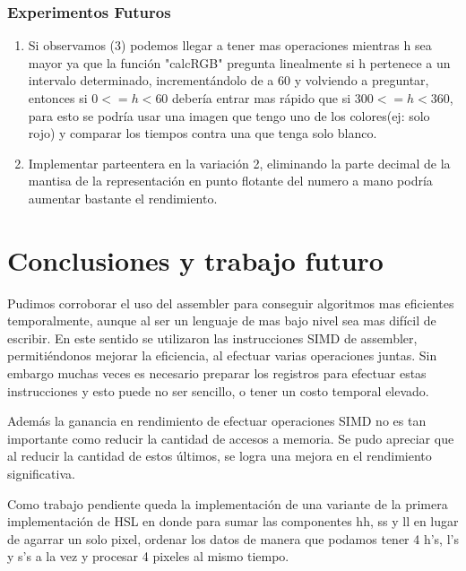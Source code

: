 \documentclass[a4paper]{article}
\begin{document}
\subsubsection{Experimentos Futuros}
\begin{enumerate}
  \item
    Si observamos (3) podemos llegar a tener mas operaciones mientras h sea mayor ya que la función "calcRGB" pregunta linealmente si h pertenece a un intervalo determinado, incrementándolo de a 60 y volviendo a preguntar, entonces si $0<=h<60$ debería entrar mas rápido que si $300<=h<360$, para esto se podría usar una imagen que tengo uno de los colores(ej: solo rojo) y comparar los tiempos contra una que tenga solo blanco.

  \item
    Implementar parteentera en la variación 2, eliminando la parte decimal de la mantisa de la representación en punto flotante del numero a mano podría aumentar bastante el rendimiento.
\end{enumerate}

\section{Conclusiones y trabajo futuro}

Pudimos corroborar el uso del assembler para conseguir algoritmos mas eficientes temporalmente, aunque al ser un lenguaje de mas bajo nivel sea mas difícil de escribir. En este sentido se utilizaron las instrucciones SIMD de assembler, permitiéndonos mejorar la eficiencia, al efectuar varias operaciones juntas. Sin embargo muchas veces es necesario preparar los registros para efectuar estas instrucciones y esto puede no ser sencillo, o tener un costo temporal elevado.

Además la ganancia en rendimiento de efectuar operaciones SIMD no es tan importante como reducir la cantidad de accesos a memoria. Se pudo apreciar que al reducir la cantidad de estos últimos, se logra una mejora en el rendimiento significativa.

Como trabajo pendiente queda la implementación de una variante de la primera implementación de HSL en donde para sumar las componentes hh, ss y ll en lugar de agarrar un solo pixel, ordenar los datos de manera que podamos tener 4 h's, l's y s's a la vez y procesar 4 pixeles al mismo tiempo.
\end{document}
